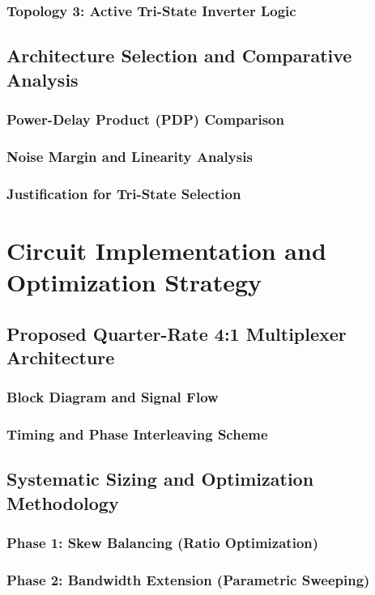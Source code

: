         \subsection{Topology 3: Active Tri-State Inverter Logic}
    \section{Architecture Selection and Comparative Analysis}
        \subsection{Power-Delay Product (PDP) Comparison}
        \subsection{Noise Margin and Linearity Analysis}
        \subsection{Justification for Tri-State Selection}

\chapter{Circuit Implementation and Optimization Strategy}
    \section{Proposed Quarter-Rate 4:1 Multiplexer Architecture}
        \subsection{Block Diagram and Signal Flow}
        \subsection{Timing and Phase Interleaving Scheme}
    \section{Systematic Sizing and Optimization Methodology}
        \subsection{Phase 1: Skew Balancing (Ratio Optimization)}
        \subsection{Phase 2: Bandwidth Extension (Parametric Sweeping)}

